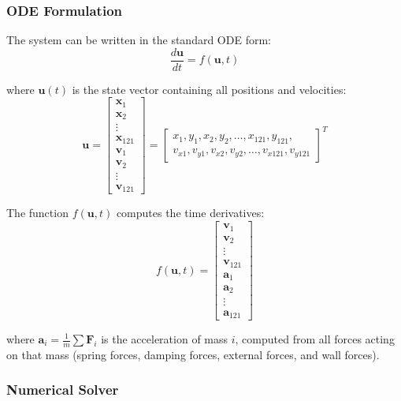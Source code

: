 \documentclass[11pt,a4paper]{article}
\begin{document}
\subsubsection{ODE Formulation}

\noindent The system can be written in the standard ODE form:
\begin{equation}
\frac{d\mathbf{u}}{dt} = f(\mathbf{u}, t)
\label{eq:ode_form}
\end{equation}

\noindent where $\mathbf{u}(t)$ is the state vector containing all positions and velocities:
\begin{equation}
\mathbf{u} = \begin{bmatrix}
\mathbf{x}_1 \\ \mathbf{x}_2 \\ \vdots \\ \mathbf{x}_{121} \\
\mathbf{v}_1 \\ \mathbf{v}_2 \\ \vdots \\ \mathbf{v}_{121}
\end{bmatrix} = \begin{bmatrix}
x_1, y_1, x_2, y_2, \ldots, x_{121}, y_{121}, \\
v_{x1}, v_{y1}, v_{x2}, v_{y2}, \ldots, v_{x121}, v_{y121}
\end{bmatrix}^T
\label{eq:state_vector}
\end{equation}

\noindent The function $f(\mathbf{u}, t)$ computes the time derivatives:
\begin{equation}
f(\mathbf{u}, t) = \begin{bmatrix}
\mathbf{v}_1 \\ \mathbf{v}_2 \\ \vdots \\ \mathbf{v}_{121} \\
\mathbf{a}_1 \\ \mathbf{a}_2 \\ \vdots \\ \mathbf{a}_{121}
\end{bmatrix}
\end{equation}

\noindent where $\mathbf{a}_i = \frac{1}{m} \sum \mathbf{F}_i$ is the acceleration of mass $i$, computed from all forces acting on that mass (spring forces, damping forces, external forces, and wall forces).

\subsubsection{Numerical Solver}
\end{document}
